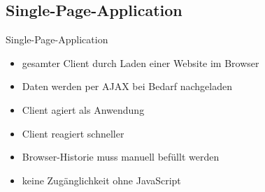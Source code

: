 \subsection{Single-Page-Application}

\begin{frame}{Single-Page-Application}
  \begin{itemize}
    \item gesamter Client durch Laden einer Website im Browser
    \item Daten werden per AJAX bei Bedarf nachgeladen\\[2ex]
    \item[\goodmark] Client agiert als Anwendung
    \item[\goodmark] Client reagiert schneller\\[2ex]
    \item[\badmark] Browser-Historie muss manuell befüllt werden
    \item[\badmark] keine Zugänglichkeit ohne JavaScript
    \end{itemize}
\end{frame}

